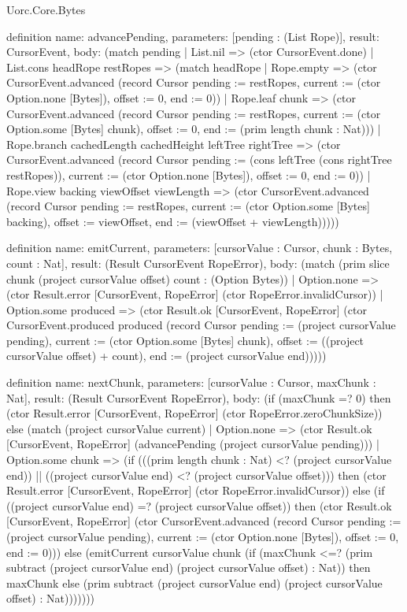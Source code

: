 \begin{lexlean}{Uorc.Core.Bytes}
\begin{semanticmodule}
definition{
  name: advancePending,
  parameters: [pending : (List Rope)],
  result: CursorEvent,
  body: (match pending
    | List.nil => (ctor CursorEvent.done)
    | List.cons headRope restRopes => (match headRope
      | Rope.empty => (ctor CursorEvent.advanced (record Cursor {pending := restRopes, current := (ctor Option.none [Bytes]), offset := 0, end := 0}))
      | Rope.leaf chunk => (ctor CursorEvent.advanced (record Cursor {pending := restRopes, current := (ctor Option.some [Bytes] chunk), offset := 0, end := (prim length chunk : Nat)}))
      | Rope.branch cachedLength cachedHeight leftTree rightTree => (ctor CursorEvent.advanced (record Cursor {pending := (cons leftTree (cons rightTree restRopes)), current := (ctor Option.none [Bytes]), offset := 0, end := 0}))
      | Rope.view backing viewOffset viewLength => (ctor CursorEvent.advanced (record Cursor {pending := restRopes, current := (ctor Option.some [Bytes] backing), offset := viewOffset, end := (viewOffset + viewLength)}))))
}

definition{
  name: emitCurrent,
  parameters: [cursorValue : Cursor, chunk : Bytes, count : Nat],
  result: (Result CursorEvent RopeError),
  body: (match (prim slice chunk (project cursorValue offset) count : (Option Bytes))
    | Option.none => (ctor Result.error [CursorEvent, RopeError] (ctor RopeError.invalidCursor))
    | Option.some produced => (ctor Result.ok [CursorEvent, RopeError] (ctor CursorEvent.produced produced (record Cursor {pending := (project cursorValue pending), current := (ctor Option.some [Bytes] chunk), offset := ((project cursorValue offset) + count), end := (project cursorValue end)}))))
}

definition{
  name: nextChunk,
  parameters: [cursorValue : Cursor, maxChunk : Nat],
  result: (Result CursorEvent RopeError),
  body: (if (maxChunk =? 0) then (ctor Result.error [CursorEvent, RopeError] (ctor RopeError.zeroChunkSize)) else (match (project cursorValue current)
    | Option.none => (ctor Result.ok [CursorEvent, RopeError] (advancePending (project cursorValue pending)))
    | Option.some chunk => (if (((prim length chunk : Nat) <? (project cursorValue end)) || ((project cursorValue end) <? (project cursorValue offset))) then (ctor Result.error [CursorEvent, RopeError] (ctor RopeError.invalidCursor)) else (if ((project cursorValue end) =? (project cursorValue offset)) then (ctor Result.ok [CursorEvent, RopeError] (ctor CursorEvent.advanced (record Cursor {pending := (project cursorValue pending), current := (ctor Option.none [Bytes]), offset := 0, end := 0}))) else (emitCurrent cursorValue chunk (if (maxChunk <=? (prim subtract (project cursorValue end) (project cursorValue offset) : Nat)) then maxChunk else (prim subtract (project cursorValue end) (project cursorValue offset) : Nat)))))))
}


\end{semanticmodule}
\end{lexlean}
